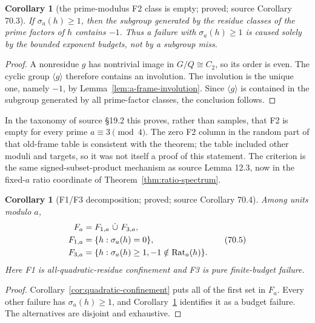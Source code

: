 \documentclass[10pt,reqno]{amsart}
\newtheorem{corollary}[theorem]{Corollary}
\theoremstyle{definition}
\newcommand{\1}{\mathbf 1}
\begin{document}
\begin{corollary}[the prime-modulus F2 class is empty; proved; source Corollary 70.3]\label{cor:prime-F2-empty}  If
$\sigma_a(h)\geq1$, then the subgroup generated by the residue classes of
the prime factors of $h$ contains $-1$.  Thus a failure with
$\sigma_a(h)\geq1$ is caused solely by the bounded exponent budgets, not
by a subgroup miss.

\end{corollary}
\begin{proof} A nonresidue $g$ has nontrivial image in $G/Q\cong C_2$, so
its order is even.  The cyclic group $\langle g\rangle$ therefore contains
an involution.  The involution is the unique one, namely $-1$, by Lemma~\ref{lem:a-frame-involution}.  Since $\langle g\rangle$ is contained in the subgroup generated by
all prime-factor classes, the conclusion follows.
\end{proof}

In the taxonomy of source \S19.2 this proves, rather than samples, that F2 is empty
for every prime $a\equiv3\pmod4$.  The zero F2 column in the random part of
that old-frame table is consistent with the theorem; the table included
other moduli and targets, so it was not itself a proof of this statement.
The criterion is the same signed-subset-product mechanism as source Lemma 12.3,
now in the fixed-$a$ ratio coordinate of Theorem~\ref{thm:ratio-spectrum}.

\begin{corollary}[F1/F3 decomposition; proved; source Corollary 70.4]\label{cor:F1-F3}  Among units modulo $a$,
\begin{equation}
 \begin{split}
 F_a&=F_{1,a}\ \dot\cup\ F_{3,a},\\
 F_{1,a}&=\{h:\sigma_a(h)=0\},\\
 F_{3,a}&=\{h:\sigma_a(h)\geq1,
                         -1\notin{\rm Rat}_a(h)\}.
 \end{split}                                                \tag{70.5}
\end{equation}
Here F1 is all-quadratic-residue confinement and F3 is pure finite-budget
failure.

\end{corollary}
\begin{proof} Corollary~\ref{cor:quadratic-confinement} puts all of the first set in $F_a$.  Every other
failure has $\sigma_a(h)\geq1$, and Corollary~\ref{cor:prime-F2-empty} identifies it as a
budget failure.  The alternatives are disjoint and exhaustive.
\end{proof}
\end{document}
